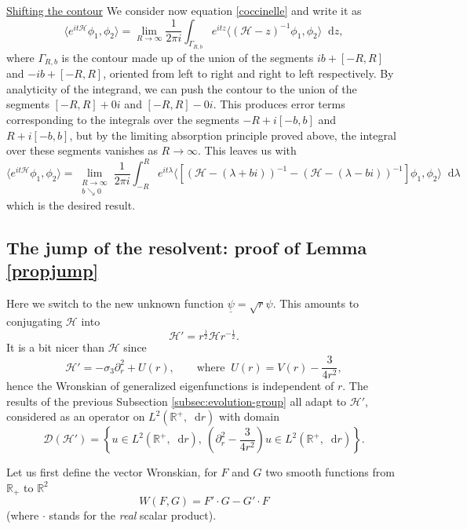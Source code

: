 \documentclass[11 pt]{amsart}
\theoremstyle{definition}
\theoremstyle{remark}
\numberwithin{equation}{section}
\newcommand{\dd}{\mathop{}\!\mathrm{d}}
\begin{document}
\medskip

\noindent \underline{Shifting the contour} 
We consider now equation \eqref{coccinelle} and write it as
$$
 \langle e^{it\mathcal{H}} \phi_1 , \phi_2 \rangle = \lim_{R \to \infty} \frac{1}{2\pi i} \int_{\Gamma_{R,b}} e^{itz} \langle (\mathcal{H} - z)^{-1} \phi_1,\phi_2 \rangle \dd z,
$$
where $\Gamma_{R,b}$ is the contour made up of the union of the segments $i b + [-R,R]$ and $-ib + [-R,R]$, oriented from left to right and right to left respectively. By analyticity of the integrand, we can push the contour to the union of the segments $ [-R,R] + 0 i$ and $[-R,R] - 0i$. This produces error terms corresponding to the integrals over the segments $-R + i [-b,b]$ and $R + i [-b,b]$, but by the limiting absorption principle proved above, the integral over these segments vanishes as $R \to \infty$. This leaves us with
$$
 \langle e^{it\mathcal{H}} \phi_1 , \phi_2 \rangle = \lim_{\substack{R \to \infty \\ b \searrow 0}} \frac{1}{2\pi i} \int_{-R}^R e^{it\lambda} \langle \left[  (\mathcal{H} - (\lambda+b i))^{-1} -  (\mathcal{H} - (\lambda - b i))^{-1}  \right] \phi_1,\phi_2 \rangle \dd \lambda
$$
which is the desired result. 

\subsection{The jump of the resolvent: proof of Lemma \ref{propjump}}

\label{ecureuil2}

Here we switch to the new unknown function $\underline{\psi} = \sqrt{r} \psi$. This amounts to conjugating $\mathcal{H}$ into
$$
\mathcal{H}' = r^{\frac 12} \mathcal{H}r^{-\frac 12}.
$$
It is a bit nicer than $\mathcal{H}$ since 
\begin{equation} \label{jump-resolvent:id:mathcalH'}
\mathcal{H}' = -\sigma_3 \partial_r^2 + U(r), \qquad \mbox{where} \;\;U(r)=V(r)-\frac{3}{4r^2},
\end{equation}
hence the Wronskian of generalized eigenfunctions is independent of $r$. The results of the previous Subsection \ref{subsec:evolution-group} all adapt to $\mathcal H'$, considered as an operator on $L^2(\mathbb R^+,\dd r)$ with domain
$$
\mathcal D(\mathcal H')=\left\{u\in L^2(\mathbb R^+,\dd r), \ (\partial_r^2-\frac{3}{4r^2})u\in L^2(\mathbb R^+,\dd r)\right\}.
$$

Let us first define the vector Wronskian, for $F$ and $G$ two smooth functions from $\mathbb{R}_+$ to $\mathbb{R}^2$
$$
W(F,G) = F' \cdot G - G' \cdot F
$$
(where $\cdot$ stands for the \textit{real} scalar product).
\end{document}
